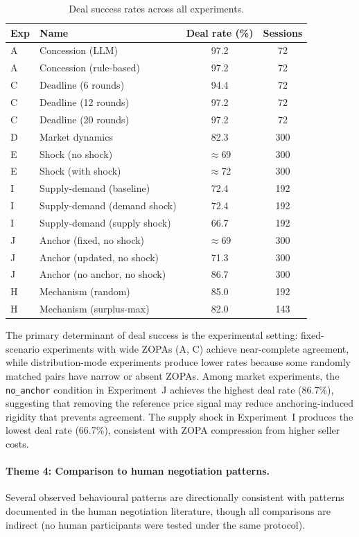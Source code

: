 \begin{table}[ht]
\centering
\caption{Deal success rates across all experiments.}
\label{tab:deal-rates}
\small
\begin{tabular}{@{}llcc@{}}
\toprule
Exp & Name & Deal rate (\%) & Sessions \\
\midrule
A & Concession (LLM) & 97.2 & 72 \\
A & Concession (rule-based) & 97.2 & 72 \\
C & Deadline (6 rounds) & 94.4 & 72 \\
C & Deadline (12 rounds) & 97.2 & 72 \\
C & Deadline (20 rounds) & 97.2 & 72 \\
D & Market dynamics & 82.3 & 300 \\
E & Shock (no shock) & $\approx$69 & 300 \\
E & Shock (with shock) & $\approx$72 & 300 \\
I & Supply-demand (baseline) & 72.4 & 192 \\
I & Supply-demand (demand shock) & 72.4 & 192 \\
I & Supply-demand (supply shock) & 66.7 & 192 \\
J & Anchor (fixed, no shock) & $\approx$69 & 300 \\
J & Anchor (updated, no shock) & 71.3 & 300 \\
J & Anchor (no anchor, no shock) & 86.7 & 300 \\
H & Mechanism (random) & 85.0 & 192 \\
H & Mechanism (surplus-max) & 82.0 & 143 \\
\bottomrule
\end{tabular}
\end{table}

The primary determinant of deal success is the experimental setting: fixed-scenario experiments with wide ZOPAs (A, C) achieve near-complete agreement, while distribution-mode experiments produce lower rates because some randomly matched pairs have narrow or absent ZOPAs.  Among market experiments, the \texttt{no\_anchor} condition in Experiment~J achieves the highest deal rate (86.7\%), suggesting that removing the reference price signal may reduce anchoring-induced rigidity that prevents agreement.  The supply shock in Experiment~I produces the lowest deal rate (66.7\%), consistent with ZOPA compression from higher seller costs.

\paragraph{Theme 4: Comparison to human negotiation patterns.}
Several observed behavioural patterns are directionally consistent with patterns documented in the human negotiation literature, though all comparisons are indirect (no human participants were tested under the same protocol).

